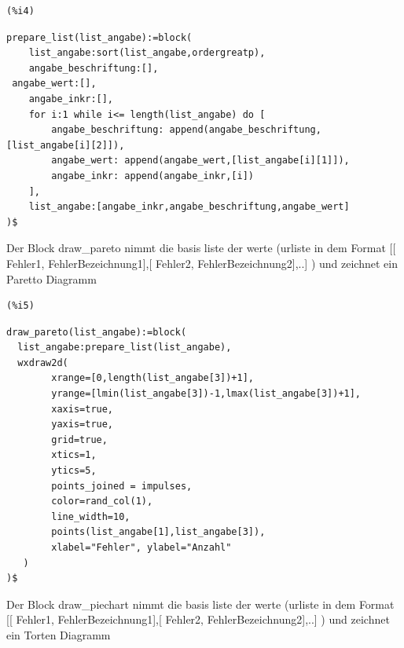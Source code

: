 \documentclass{article}
\begin{document}
\noindent
\begin{minipage}[t]{8ex}{\color{red}\bf
\begin{verbatim}
(%i4) 
\end{verbatim}}
\end{minipage}
\begin{minipage}[t]{\textwidth}{\color{blue}
\begin{verbatim}
prepare_list(list_angabe):=block(
    list_angabe:sort(list_angabe,ordergreatp),
    angabe_beschriftung:[],
 angabe_wert:[],
    angabe_inkr:[],
    for i:1 while i<= length(list_angabe) do [
        angabe_beschriftung: append(angabe_beschriftung,[list_angabe[i][2]]),
        angabe_wert: append(angabe_wert,[list_angabe[i][1]]),
        angabe_inkr: append(angabe_inkr,[i])
    ],
    list_angabe:[angabe_inkr,angabe_beschriftung,angabe_wert]
)$
\end{verbatim}}
\end{minipage}

Der Block  draw\_pareto nimmt die basis liste der werte 
    (urliste in dem Format [[ Fehler1, FehlerBezeichnung1],[ Fehler2, FehlerBezeichnung2],..] )
und zeichnet ein Paretto Diagramm

\noindent
\begin{minipage}[t]{8ex}{\color{red}\bf
\begin{verbatim}
(%i5) 
\end{verbatim}}
\end{minipage}
\begin{minipage}[t]{\textwidth}{\color{blue}
\begin{verbatim}
draw_pareto(list_angabe):=block(
  list_angabe:prepare_list(list_angabe),
  wxdraw2d(
        xrange=[0,length(list_angabe[3])+1], 
        yrange=[lmin(list_angabe[3])-1,lmax(list_angabe[3])+1], 
        xaxis=true, 
        yaxis=true, 
        grid=true, 
        xtics=1, 
        ytics=5,
        points_joined = impulses,
        color=rand_col(1),
        line_width=10,
        points(list_angabe[1],list_angabe[3]),
        xlabel="Fehler", ylabel="Anzahl"
   )
)$
\end{verbatim}}
\end{minipage}

Der Block  draw\_piechart nimmt die basis liste der werte 
    (urliste in dem Format [[ Fehler1, FehlerBezeichnung1],[ Fehler2, FehlerBezeichnung2],..] )
und zeichnet ein Torten Diagramm
\end{document}
